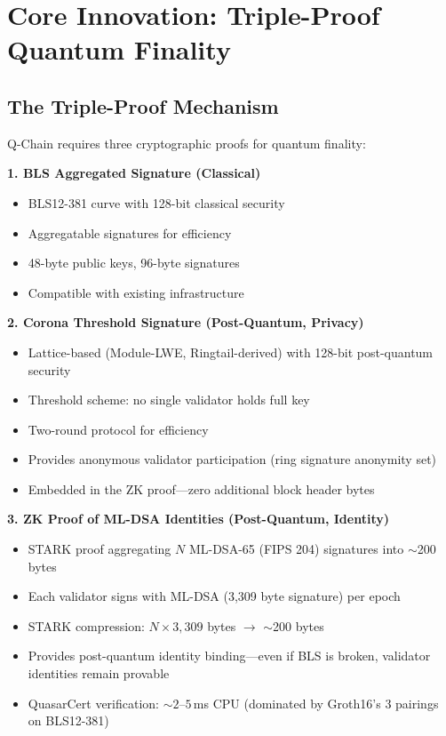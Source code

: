 \section{Core Innovation: Triple-Proof Quantum Finality}


\subsection{The Triple-Proof Mechanism}

Q-Chain requires three cryptographic proofs for quantum finality:

\textbf{1. BLS Aggregated Signature (Classical)}
\begin{itemize}
\item BLS12-381 curve with 128-bit classical security
\item Aggregatable signatures for efficiency
\item 48-byte public keys, 96-byte signatures
\item Compatible with existing infrastructure
\end{itemize}

\textbf{2. Corona Threshold Signature (Post-Quantum, Privacy)}
\begin{itemize}
\item Lattice-based (Module-LWE, Ringtail-derived) with 128-bit post-quantum security
\item Threshold scheme: no single validator holds full key
\item Two-round protocol for efficiency
\item Provides anonymous validator participation (ring signature anonymity set)
\item Embedded in the ZK proof---zero additional block header bytes
\end{itemize}

\textbf{3. ZK Proof of ML-DSA Identities (Post-Quantum, Identity)}
\begin{itemize}
\item STARK proof aggregating $N$ ML-DSA-65 (FIPS 204) signatures into $\sim$200 bytes
\item Each validator signs with ML-DSA (3,309 byte signature) per epoch
\item STARK compression: $N \times 3{,}309$ bytes $\to$ $\sim$200 bytes
\item Provides post-quantum identity binding---even if BLS is broken, validator identities remain provable
\item QuasarCert verification: ${\sim}2$--$5$\,ms CPU (dominated by Groth16's 3 pairings on BLS12-381)~\cite{lux-benchmarks}
\end{itemize}


